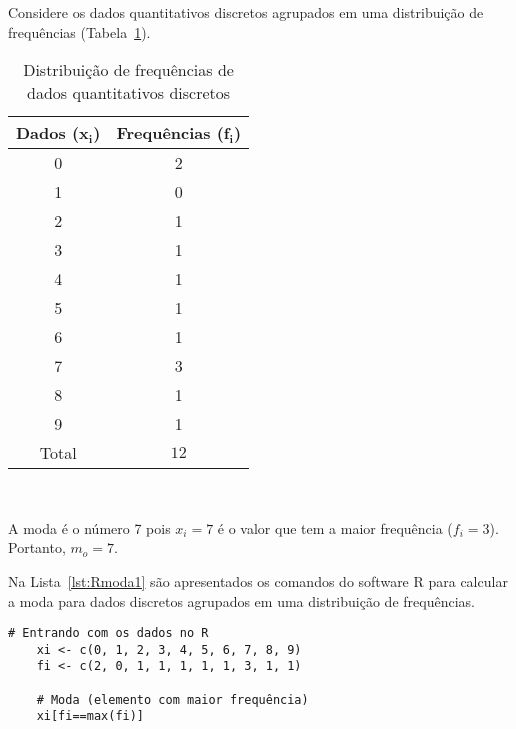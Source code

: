 \documentclass[11pt,fleqn]{book} %
\begin{document}
\begin{example}

Considere os dados quantitativos discretos agrupados em uma distribuição de frequências (Tabela~\ref{tab:distdadosdiscretosmoda}). \\


	\begin{table}[h]
	\caption{Distribuição de frequências de dados quantitativos discretos}
	\label{tab:distdadosdiscretosmoda} 
	\vspace{-0.1cm}
	\centering
	\begin{tabular}{c c}
	\toprule
	\textbf{Dados} ($\bm{x_i}$) & \textbf{Frequências} ($\bm{f_i}$) \\
	\midrule
	0 & 2 \\
	1 & 0 \\
	2 & 1 \\
	3 & 1 \\
	4 & 1 \\
	5 & 1 \\
	6 & 1 \\
	7 & 3 \\
	8 & 1 \\
	9 & 1 \\
	\hline
	Total & $12$ \\
	\bottomrule
	\end{tabular} \\
	\end{table}
	

A moda é o número 7 pois $x_i=7$ é o valor que tem a maior frequência ($f_i=3$). Portanto, $m_o=7$.
	
\end{example}

\vspace{0,3cm}

Na Lista~\ref{lst:Rmoda1} são apresentados os comandos do software R para calcular a moda para dados discretos agrupados em uma distribuição de frequências. \\

\begin{scriptsize}
	\estiloR
	\begin{lstlisting}[caption={Comandos do software R}, label=lst:Rmoda1]
	# Entrando com os dados no R
	xi <- c(0, 1, 2, 3, 4, 5, 6, 7, 8, 9)
	fi <- c(2, 0, 1, 1, 1, 1, 1, 3, 1, 1)

	# Moda (elemento com maior frequência)
	xi[fi==max(fi)]

	\end{lstlisting}
\end{scriptsize}
\end{document}
